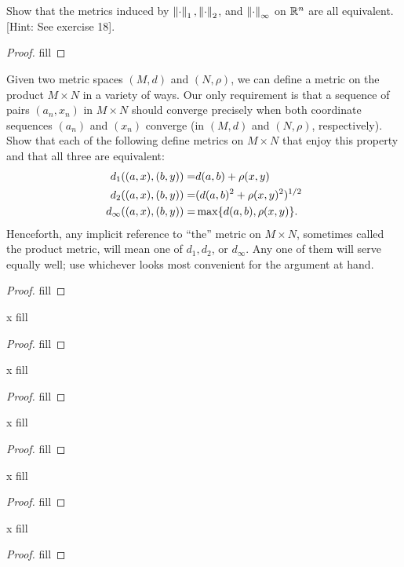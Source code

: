 \begin{exercise}{44}
Show that the metrics induced by $\left\lVert \cdot\right\rVert_1,\left\lVert \cdot\right\rVert_2$, and $\left\lVert \cdot\right\rVert_\infty$ on $\mathbb{R}^n$ are all equivalent. [Hint: See exercise 18].
\end{exercise}
\begin{proof}
fill
\end{proof} 

\begin{exercise}{46}
Given two metric spaces $(M,d)$ and $(N,\rho)$, we can define a metric on the product $M\times N$ in a variety of ways. Our only requirement is that a sequence of pairs $(a_n,x_n)$ in $M\times N$ should converge precisely when both coordinate sequences $(a_n)$ and $(x_n)$ converge (in $(M,d)$ and $(N,\rho)$, respectively). Show that each of the following define metrics on $M\times N$ that enjoy this property and that all three are equivalent:
\begin{align*}
    d_1((a,x),(b,y)) =& d(a,b)+\rho(x,y)\\
    d_2((a,x),(b,y)) =& (d(a,b)^2+\rho(x,y)^2)^{1/2}\\
    d_\infty((a,x),(b,y)) =& \max\{d(a,b),\rho(x,y)\}.
\end{align*}
Henceforth, any implicit reference to ``the'' metric on $M\times N$, sometimes called the product metric, will mean one of $d_1,d_2$, or $d_\infty$. Any one of them will serve equally well; use whichever looks most convenient for the argument at hand.
\end{exercise}
\begin{proof}
fill
\end{proof} 

\begin{exercise}{x}
fill
\end{exercise}
\begin{proof}
fill
\end{proof} 

\begin{exercise}{x}
fill
\end{exercise}
\begin{proof}
fill
\end{proof} 

\begin{exercise}{x}
fill
\end{exercise}
\begin{proof}
fill
\end{proof} 

\begin{exercise}{x}
fill
\end{exercise}
\begin{proof}
fill
\end{proof} 

\begin{exercise}{x}
fill
\end{exercise}
\begin{proof}
fill
\end{proof} 